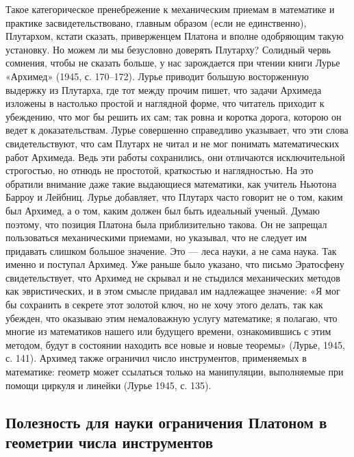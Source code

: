 Такое категорическое пренебрежение к механическим приемам в математике
и практике засвидетельствовано, главным образом (если не единственно),
Плутархом, кстати  сказать, приверженцем  Платона и  вполне одобряющим
такую установку. Но можем ли мы безусловно доверять Плутарху? Солидный
червь сомнения, чтобы не сказать  больше, у нас зарождается при чтении
книги  Лурье «Архимед»  (1945,  с. 170--172).  Лурье приводит  большую
восторженную выдержку  из Плутарха,  где тот  между прочим  пишет, что
задачи Архимеда  изложены в настолько  простой и наглядной  форме, что
читатель приходит к  убеждению, что мог бы решить их  сам; так ровна и
коротка дорога,  которою он ведет к  доказательствам. Лурье совершенно
справедливо указывает, что эти  слова свидетельствуют, что сам Плутарх
не читал  и не  мог понимать математических  работ Архимеда.  Ведь эти
работы  сохранились,  они  отличаются  исключительной  строгостью,  но
отнюдь  не  простотой,  краткостью  и наглядностью.  На  это  обратили
внимание даже такие выдающиеся  математики, как учитель Ньютона Барроу
и Лейбниц. Лурье добавляет, что Плутарх  часто говорит не о том, каким
был Архимед,  а о том, каким  должен был быть идеальный  ученый. Думаю
поэтому,  что  позиция  Платона  была  приблизительно  такова.  Он  не
запрещал  пользоваться механическими  приемами,  но  указывал, что  не
следует им придавать  слишком большое значение. Это ---  леса науки, а
не сама наука. Так именно и поступал Архимед. Уже раньше было указано,
что письмо  Эратосфену свидетельствует,  что Архимед  не скрывал  и не
стыдился  механических  методов как  эвристических,  и  в этом  смысле
придавал  им  надлежащее  значение:  «Я мог  бы  сохранить  в  секрете
этот  золотой ключ,  но не  хочу этого  делать, так  как убежден,  что
оказываю этим немаловажную услугу математике; я полагаю, что многие из
математиков нашего или будущего времени, ознакомившись с этим методом,
будут в состоянии находить все новые и новые теоремы» (Лурье, 1945, с.
141).  Архимед  также  ограничил  число  инструментов,  применяемых  в
математике: геометр может ссылаться только на манипуляции, выполняемые
при помощи циркуля и линейки (Лурье 1945, с. 135).

\subsection{Полезность  для  науки  ограничения Платоном  в  геометрии
числа инструментов}

